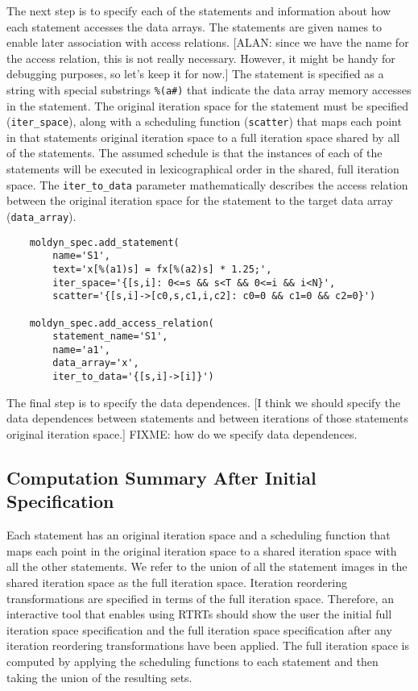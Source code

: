 \documentclass{article}
\begin{document}
The next step is to specify each of the statements and information about 
how each statement accesses the data arrays.
The statements are given names to enable later association with access relations.
[ALAN: since we have the name for the access relation, this is not really necessary.
However, it might be handy for debugging purposes, so let's keep it for now.]
The statement is specified as a string with special substrings {\tt \%(a\#)}
that indicate the data array memory accesses in the statement.  The original iteration space for the statement must be specified ({\tt iter\_space}), along with a scheduling function ({\tt scatter}) that maps each point in that statements original iteration space to a full iteration space shared by all of the statements.  The assumed schedule is that the instances of each of the statements will be executed in lexicographical order in the shared, full iteration space.  The {\tt iter\_to\_data} parameter mathematically describes the access relation between the original iteration space for the statement to the target data array ({\tt data\_array}).\begin{verbatim}
    moldyn_spec.add_statement(
        name='S1',
        text='x[%(a1)s] = fx[%(a2)s] * 1.25;',
        iter_space='{[s,i]: 0<=s && s<T && 0<=i && i<N}',
        scatter='{[s,i]->[c0,s,c1,i,c2]: c0=0 && c1=0 && c2=0}')

    moldyn_spec.add_access_relation(
        statement_name='S1',
        name='a1',
        data_array='x',
        iter_to_data='{[s,i]->[i]}')
\end{verbatim}


The final step is to specify the data dependences.
[I think we should specify the data dependences between statements and between iterations of those statements original iteration space.]
FIXME: how do we specify data dependences.

\subsection{Computation Summary After Initial Specification}

Each statement has an original iteration space and a scheduling function that maps each point in the original iteration space to a shared iteration space with all the other statements.  We refer to the union of all the statement images in the shared iteration space as the full iteration space.  Iteration reordering transformations are specified in terms of the full iteration space.  Therefore, an interactive tool that enables using RTRTs should show the user the initial full iteration space specification and the full iteration space specification after any iteration reordering transformations have been applied.  The full iteration space is computed by applying the scheduling functions to each statement and then taking the union of the resulting sets.
\end{document}
